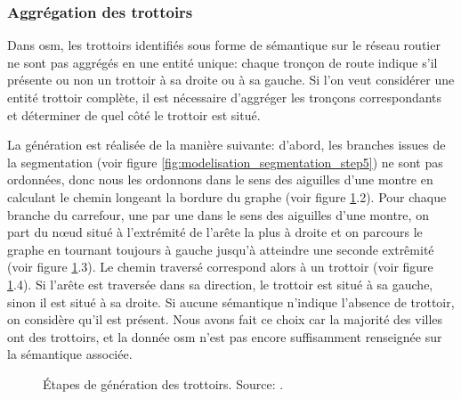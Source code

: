 \subsubsection{Aggrégation des trottoirs}

Dans \gls{osm}, les trottoirs identifiés sous forme de sémantique sur le réseau routier ne sont pas aggrégés en une entité unique: chaque tronçon de route indique s'il présente ou non un trottoir à sa droite ou à sa gauche. Si l'on veut considérer une entité trottoir complète, il est nécessaire d'aggréger les tronçons correspondants et déterminer de quel côté le trottoir est situé.

La génération est réalisée de la manière suivante: d'abord, les branches issues de la segmentation (voir figure \ref{fig:modelisation_segmentation_step5}) ne sont pas ordonnées, donc nous les ordonnons dans le sens des aiguilles d'une montre en calculant le chemin longeant la bordure du graphe (voir figure \ref{fig:modelisation_calcul_pieton_trottoirs}.2). Pour chaque branche du carrefour, une par une dans le sens des aiguilles d'une montre, on part du nœud situé à l'extrémité de l'arête la plus à droite et on parcours le graphe en tournant toujours à gauche jusqu'à atteindre une seconde extrêmité (voir figure \ref{fig:modelisation_calcul_pieton_trottoirs}.3). Le chemin traversé correspond alors à un trottoir (voir figure \ref{fig:modelisation_calcul_pieton_trottoirs}.4). Si l'arête est traversée dans sa direction, le trottoir est situé à sa gauche, sinon il est situé à sa droite. Si aucune sémantique n'indique l'absence de trottoir, on considère qu'il est présent. Nous avons fait ce choix car la majorité des villes ont des trottoirs, et la donnée \gls{osm} n'est pas encore suffisamment renseignée sur la sémantique associée.

\begin{figure}[ht]
    \centering
    \caption[Génération de trottoirs]{Étapes de génération des trottoirs. Source: \citep{Kalsron2022}.}
    \label{fig:modelisation_calcul_pieton_trottoirs}
\end{figure}

